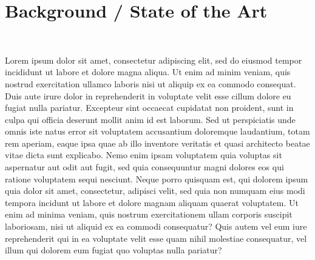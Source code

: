\section{Background / State of the Art}\

Lorem ipsum dolor sit amet, consectetur adipiscing elit, sed do eiusmod tempor incididunt ut labore et dolore magna aliqua. Ut enim ad minim veniam, quis nostrud exercitation ullamco laboris nisi ut aliquip ex ea commodo consequat. Duis aute irure dolor in reprehenderit in voluptate velit esse cillum dolore eu fugiat nulla pariatur. Excepteur sint occaecat cupidatat non proident, sunt in culpa qui officia deserunt mollit anim id est laborum.
Sed ut perspiciatis unde omnis iste natus error sit voluptatem accusantium doloremque laudantium, totam rem aperiam, eaque ipsa quae ab illo inventore veritatis et quasi architecto beatae vitae dicta sunt explicabo. Nemo enim ipsam voluptatem quia voluptas sit aspernatur aut odit aut fugit, sed quia consequuntur magni dolores eos qui ratione voluptatem sequi nesciunt. Neque porro quisquam est, qui dolorem ipsum quia dolor sit amet, consectetur, adipisci velit, sed quia non numquam eius modi tempora incidunt ut labore et dolore magnam aliquam quaerat voluptatem. Ut enim ad minima veniam, quis nostrum exercitationem ullam corporis suscipit laboriosam, nisi ut aliquid ex ea commodi consequatur? Quis autem vel eum iure reprehenderit qui in ea voluptate velit esse quam nihil molestiae consequatur, vel illum qui dolorem eum fugiat quo voluptas nulla pariatur?

